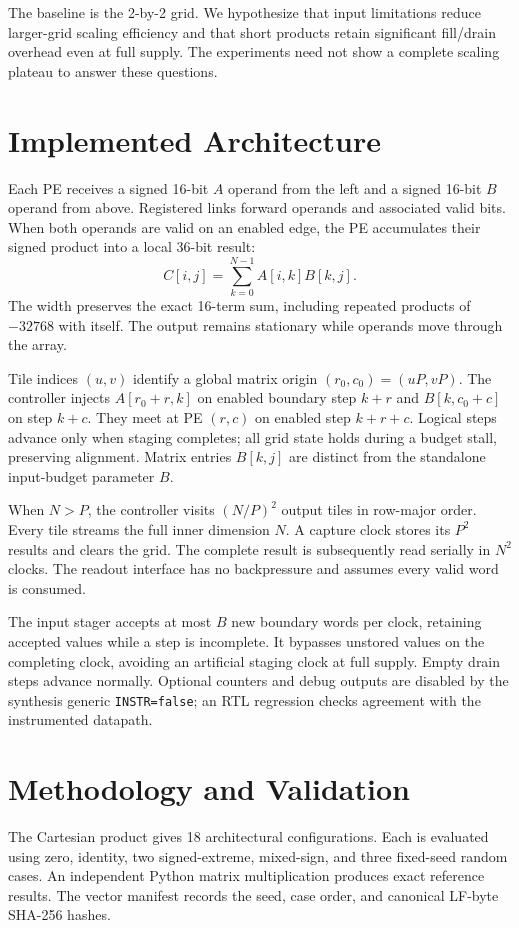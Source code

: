 \documentclass[conference]{IEEEtran}
\begin{document}
The baseline is the 2-by-2 grid. We hypothesize that input limitations reduce larger-grid scaling efficiency and that short products retain significant fill/drain overhead even at full supply. The experiments need not show a complete scaling plateau to answer these questions.

\section{Implemented Architecture}
Each PE receives a signed 16-bit $A$ operand from the left and a signed 16-bit $B$ operand from above. Registered links forward operands and associated valid bits. When both operands are valid on an enabled edge, the PE accumulates their signed product into a local 36-bit result:
\begin{equation}
 C[i,j]=\sum_{k=0}^{N-1} A[i,k]B[k,j].
\end{equation}
The width preserves the exact 16-term sum, including repeated products of $-32768$ with itself. The output remains stationary while operands move through the array.

Tile indices $(u,v)$ identify a global matrix origin $(r_0,c_0)=(uP,vP)$. The controller injects $A[r_0+r,k]$ on enabled boundary step $k+r$ and $B[k,c_0+c]$ on step $k+c$. They meet at PE $(r,c)$ on enabled step $k+r+c$. Logical steps advance only when staging completes; all grid state holds during a budget stall, preserving alignment. Matrix entries $B[k,j]$ are distinct from the standalone input-budget parameter $B$.

When $N>P$, the controller visits $(N/P)^2$ output tiles in row-major order. Every tile streams the full inner dimension $N$. A capture clock stores its $P^2$ results and clears the grid. The complete result is subsequently read serially in $N^2$ clocks. The readout interface has no backpressure and assumes every valid word is consumed.

The input stager accepts at most $B$ new boundary words per clock, retaining accepted values while a step is incomplete. It bypasses unstored values on the completing clock, avoiding an artificial staging clock at full supply. Empty drain steps advance normally. Optional counters and debug outputs are disabled by the synthesis generic \texttt{INSTR=false}; an RTL regression checks agreement with the instrumented datapath.

\section{Methodology and Validation}
The Cartesian product gives 18 architectural configurations. Each is evaluated using zero, identity, two signed-extreme, mixed-sign, and three fixed-seed random cases. An independent Python matrix multiplication produces exact reference results. The vector manifest records the seed, case order, and canonical LF-byte SHA-256 hashes.
\end{document}
